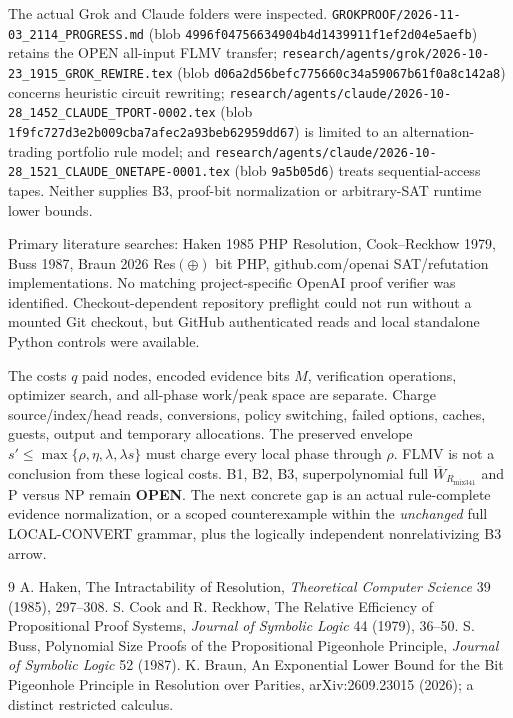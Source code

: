 \documentclass[11pt]{article}
\begin{document}
The actual Grok and Claude folders were inspected.
\texttt{GROKPROOF/2026-11-03\_2114\_PROGRESS.md}
(blob \texttt{4996f04756634904b4d1439911f1ef2d04e5aefb})
retains the OPEN all-input FLMV transfer;
\texttt{research/agents/grok/2026-10-23\_1915\_GROK\_REWIRE.tex}
(blob \texttt{d06a2d56befc775660c34a59067b61f0a8c142a8})
concerns heuristic circuit rewriting;
\texttt{research/agents/claude/2026-10-28\_1452\_CLAUDE\_TPORT-0002.tex}
(blob \texttt{1f9fc727d3e2b009cba7afec2a93beb62959dd67})
is limited to an alternation-trading portfolio rule model;
and \texttt{research/agents/claude/2026-10-28\_1521\_CLAUDE\_ONETAPE-0001.tex}
(blob \texttt{9a5b05d6}) treats sequential-access tapes.
Neither supplies B3, proof-bit normalization or arbitrary-SAT
runtime lower bounds.

Primary literature searches: Haken 1985 PHP Resolution,
Cook--Reckhow 1979, Buss 1987, Braun 2026
Res$(\oplus)$ bit PHP, github.com/openai SAT/refutation
implementations. No matching project-specific OpenAI
proof verifier was identified. Checkout-dependent repository
preflight could not run without a mounted Git checkout,
but GitHub authenticated reads and local standalone Python
controls were available.

The costs $q$ paid nodes, encoded evidence bits $M$,
verification operations, optimizer search, and all-phase
work/peak space are separate. Charge source/index/head reads,
conversions, policy switching, failed options, caches,
guests, output and temporary allocations. The preserved
envelope $s'\le\max\{\rho,\eta,\lambda,\lambda s\}$
must charge every local phase through $\rho$.
FLMV is not a conclusion from these logical costs.
B1, B2, B3, superpolynomial full
$\overline W_{R_{\mathrm{mix341}}}$ and P versus NP remain
\textbf{OPEN}. The next concrete gap is an actual
rule-complete evidence normalization, or a scoped counterexample
within the \emph{unchanged} full LOCAL-CONVERT grammar, plus
the logically independent nonrelativizing B3 arrow.

\begin{thebibliography}{9}
 A. Haken, The Intractability of Resolution,
\emph{Theoretical Computer Science} 39 (1985), 297--308.
 S. Cook and R. Reckhow,
The Relative Efficiency of Propositional Proof Systems,
\emph{Journal of Symbolic Logic} 44 (1979), 36--50.
 S. Buss, Polynomial Size Proofs of the
Propositional Pigeonhole Principle, \emph{Journal of Symbolic
Logic} 52 (1987).
 K. Braun, An Exponential Lower Bound for
the Bit Pigeonhole Principle in Resolution over Parities,
arXiv:2609.23015 (2026); a distinct restricted calculus.
\end{thebibliography}
\end{document}
